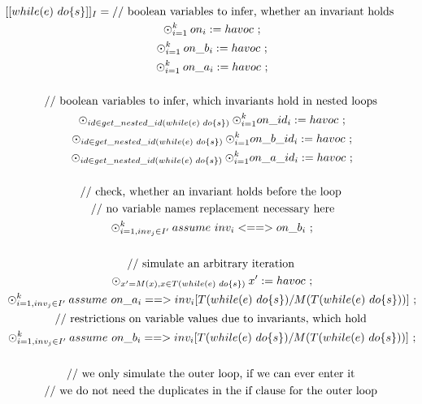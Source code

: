 \documentclass[a4paper,12pt]{article}
\begin{document}
	\vspace*{-3.0cm}
	\begin{equation*}
	\hspace*{-1.7cm}
	\begin{multlined}
	[[while(e) \text{ } do\{s\}]]_I =
	\text{// boolean variables to infer, 
		whether an invariant holds} \\
	\odot^k_{i=1} on_i := havoc \text{ ;} \\
	\odot^k_{i=1} on\_b_i := havoc \text{ ;} \\
	\odot^k_{i=1} on\_a_i := havoc \text{ ;} \\
	\\
	\text{// boolean variables to infer, 
		which invariants hold in nested loops} \\
	\odot_{id \in get\_nested\_id(while(e) \text{ } do\{s\})}
	\odot^k_{i=1} on\_id_i := havoc \text{ ;} \\
	\odot_{id \in get\_nested\_id(while(e) \text{ } do\{s\})}
	\odot^k_{i=1} on\_b\_id_i := havoc \text{ ;} \\
	\odot_{id \in get\_nested\_id(while(e) \text{ } do\{s\})}
	\odot^k_{i=1} on\_a\_id_i := havoc \text{ ;} \\
	\\
	\text{// check, 
		whether an invariant holds before the loop} \\
	\text{ // no variable names replacement 
		necessary here} \\
	\odot^k_{i=1, inv_j \in I'} assume \text{ } inv_i <==> on\_b_i \text{ ;} \\
	\\
	\text{// simulate an arbitrary iteration} \\
	\odot_{x' = M(x), x \in T(while(e) \text{ } do\{s\})}
	x' := havoc \text{ ;} \\
	\odot^k_{i=1, inv_j \in I'} 
	assume \text{ } on\_a_i ==> 
	inv_i[T(while(e) \text{ } do\{s\}) /
	M(T(while(e) \text{ } do\{s\}))] \text{ ;} \\
	\text{// restrictions on variable values
		due to invariants, which hold} \\
	\odot^k_{i=1, inv_j \in I'} 
	assume \text{ } on\_b_i ==> 
	inv_i[T(while(e) \text{ } do\{s\}) /
	M(T(while(e) \text{ } do\{s\}))] 
	\text{ ;} \\
	\\
	\text{// we only simulate the outer loop, if we can ever enter it} \\
	\text{// we do not need the duplicates 
		  in the if clause for the outer loop} \\

\end{multlined}
\end{equation*}
\end{document}
